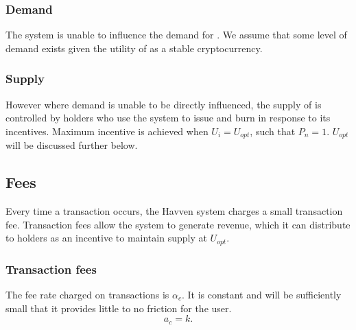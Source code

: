 \subsubsection*{Demand}

\noindent The system is unable to influence the demand for \NOM{}. We assume that some level of demand exists given the utility of \NOM{} as a stable cryptocurrency.

\subsubsection*{Supply}

\noindent However where demand is unable to be directly influenced, the supply of \NOM{} is controlled by \HAV{} holders who use the system to issue and burn \NOM{} in response to its incentives. Maximum incentive is achieved when $U_i = U_{opt}$, such that $P_n = 1$. $U_{opt}$ will be discussed further below. \\

\newpage
\subsection{Fees} Every time a \NOM{} transaction occurs, the Havven system charges a small transaction fee. Transaction fees allow the system to generate revenue, which it can distribute to \HAV{} holders as an incentive to maintain \NOM{} supply at $U_{opt}$.

\subsubsection{Transaction fees}

\noindent The fee rate charged on \NOM{} transactions is $\alpha_c$. It is constant and will be sufficiently small that it provides little to no friction for the user.\\

$$ a_c = k.$$ 

\begin{center}
\end{center}

